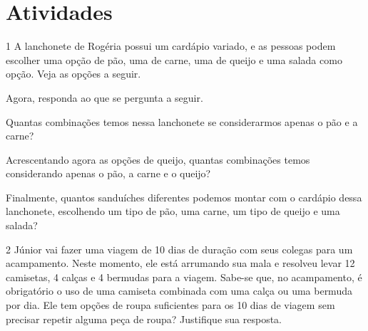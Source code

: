 \section*{Atividades}

\num{1} A lanchonete de Rogéria possui um cardápio variado, e as pessoas podem
escolher uma opção de pão, uma de carne, uma de queijo e uma salada como opção.
Veja as opções a seguir.


Agora, responda ao que se pergunta a seguir.

\begin{escolha}
\item
  Quantas combinações temos nessa lanchonete se considerarmos apenas o
  pão e a carne?\\

\item
  Acrescentando agora as opções de queijo, quantas combinações temos
  considerando apenas o pão, a carne e o queijo?\\

\item
  Finalmente, quantos sanduíches diferentes podemos montar com o
  cardápio dessa lanchonete, escolhendo um tipo de pão, uma carne, um tipo de queijo e uma
  salada?\\
\end{escolha}

\num{2} Júnior vai fazer uma viagem de 10 dias de duração com seus colegas para
um acampamento. Neste momento, ele está arrumando sua mala e resolveu
levar 12 camisetas, 4 calças e 4 bermudas para a viagem. Sabe-se que, no
acampamento, é obrigatório o uso de uma camiseta combinada com uma calça
ou uma bermuda por dia. Ele tem opções de roupa suficientes para os 10 dias de viagem sem
precisar repetir alguma peça de roupa? Justifique sua resposta.

